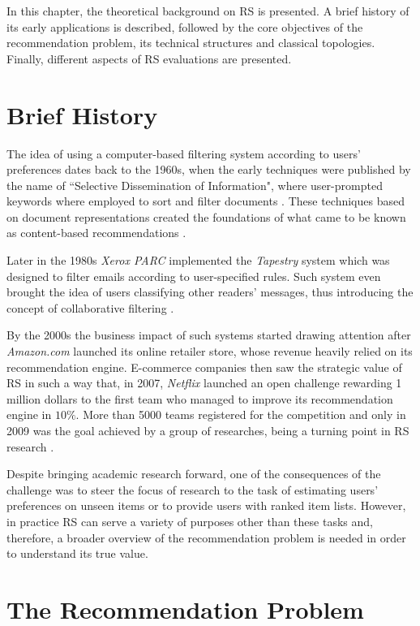 In this chapter, the theoretical background on RS is presented. A brief history of its early applications is described, followed by the core objectives of the recommendation problem, its technical structures and classical topologies. Finally, different aspects of RS evaluations are presented.

\section{Brief History}

    The idea of using a computer-based filtering system according to users' preferences dates back to  the 1960s, when the early techniques were published by the name of ``Selective Dissemination of Information", where user-prompted keywords where employed to sort and filter documents \cite{1963SDI}. These techniques based on document representations created the foundations of what came to be known as content-based recommendations \cite{2016BeyondMatrixCompletion}. 

    Later in the 1980s \textit{Xerox PARC} implemented the \textit{Tapestry} system which was designed to filter emails according to user-specified rules. Such system even brought the idea of users     classifying other readers' messages, thus introducing the concept of collaborative filtering    \cite{2016BeyondMatrixCompletion}.

    By the 2000s the business impact of such systems started drawing attention after    \textit{Amazon.com} launched its online retailer store, whose revenue heavily relied on its recommendation engine. E-commerce companies then saw the strategic value of RS in such a way that, in 2007, \textit{Netflix} launched an open challenge rewarding 1 million dollars to the first team who managed to improve its recommendation engine in $10 \%$. More than 5000 teams registered for the competition and only in 2009 was the goal achieved by a group of researches, being a turning point in RS research \cite{2007TheNetflixPrize}.
    
    Despite bringing academic research forward, one of the consequences of the challenge was to steer the focus of research to the task of estimating users' preferences on unseen items or to provide users with ranked item lists. However, in practice RS can serve a variety of purposes other than these tasks and, therefore, a broader overview of the recommendation problem is needed in order to understand its true value.

  \section{The Recommendation Problem}

